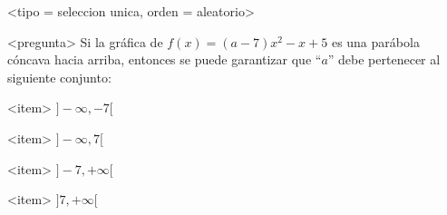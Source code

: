 <tipo = seleccion unica, orden = aleatorio>

<pregunta>
Si la gr\'afica de $f(x) = (a -7)x^2-x +5$ es una par\'abola c\'oncava hacia arriba, entonces se puede garantizar que ``$a$'' debe pertenecer al siguiente conjunto:


<item>
$]{-}\infty, -7[$

<item>
$]{-}\infty, 7[$

<item>
$]-7, +\infty[$

<item>
$]7, +\infty[$



